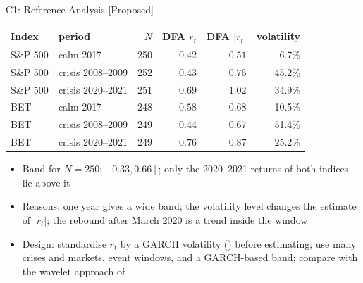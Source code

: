 \ifsolutions
\begin{frame}{C1: Reference Analysis [Proposed]}
\itemsize{\footnotesize}
\begin{center}
\scriptsize
\begin{tabular}{llrrrr}
\toprule
Index & period & $N$ & DFA $r_t$ & DFA $|r_t|$ & volatility \\
\midrule
S\&P 500 & calm 2017 & 250 & $0.42$ & $0.51$ & 6.7\% \\
S\&P 500 & crisis 2008--2009 & 252 & $0.43$ & $0.76$ & 45.2\% \\
S\&P 500 & crisis 2020--2021 & 251 & $0.69$ & $1.02$ & 34.9\% \\
BET & calm 2017 & 248 & $0.58$ & $0.68$ & 10.5\% \\
BET & crisis 2008--2009 & 249 & $0.44$ & $0.67$ & 51.4\% \\
BET & crisis 2020--2021 & 249 & $0.76$ & $0.87$ & 25.2\% \\
\bottomrule
\end{tabular}
\end{center}
\begin{itemize}
    \item Band for $N = 250$: $[0.33, 0.66]$; only the 2020--2021 returns of both indices lie above it
    \item Reasons: one year gives a wide band; the volatility level changes the estimate of $|r_t|$; the rebound after March 2020 is a trend inside the window
    \item Design: standardise $r_t$ by a GARCH volatility () before estimating; use many crises and markets, event windows, and a GARCH-based band; compare with the wavelet approach of 
\end{itemize}
\end{frame}
\fi


